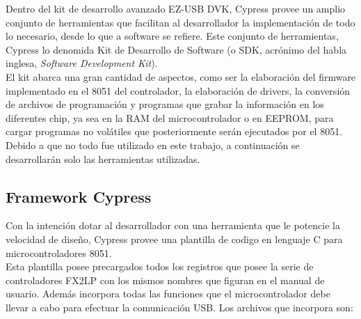 Dentro del kit de desarrollo avanzado EZ-USB DVK, Cypress provee un amplio conjunto de herramientas que facilitan al desarrollador la implementación de todo lo necesario, desde lo que a software se refiere. Este conjunto de herramientas, Cypress lo denomida Kit de Desarrollo de Software (o SDK, acrónimo del habla inglesa, {\it Software Development Kit}).\\

El kit abarca una gran cantidad de aspectos, como ser la elaboración del firmware implementado en el 8051 del controlador, la elaboración de drivers, la conversión de archivos de programación y programas que grabar la información en los diferentes chip, ya sea en la RAM del microcontrolador o en EEPROM, para cargar programas no volátiles que posteriormente serán ejecutados por el 8051.\\

Debido a que no todo fue utilizado en este trabajo, a continuación se desarrollarán solo las herramientas utilizadas.\\

\subsection{Framework Cypress}
	Con la intención dotar al desarrollador con una herramienta que le potencie la velocidad de diseño, Cypress provee una plantilla de codigo en lenguaje C para microcontroladores 8051.\\
	
	Esta plantilla posee precargados todos los registros que posee la serie de controladores FX2LP con los mismos nombres que figuran en el manual de usuario. Además incorpora todas las funciones que el microcontrolador debe llevar a cabo para efectuar la comunicación USB. Los archivos que incorpora son:\\
	

